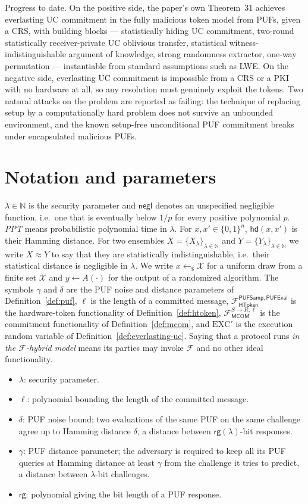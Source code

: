 \documentclass{aicr-conjecture}
\newcommand{\PUFSamp}{\mathsf{PUFSamp}}
\newcommand{\PUFEval}{\mathsf{PUFEval}}
\newcommand{\Fht}{\mathcal{F}^{\PUFSamp,\PUFEval}_{\mathsf{HToken}}}
\newcommand{\Fmcom}{\mathcal{F}^{S\to R,\ell}_{\mathsf{MCOM}}}
\newcommand{\hdist}{\mathsf{hd}}
\newcommand{\negl}{\mathsf{negl}}
\newcommand{\rge}{\mathsf{rg}}
\newcommand{\EXC}{\mathrm{EXC}'}
\newcommand{\usample}{\leftarrow_{\$}}
\begin{document}
Progress to date. On the positive side, the paper's own Theorem~31
achieves everlasting UC commitment in the fully malicious token model
from PUFs, given a CRS, with building blocks --- statistically hiding
UC commitment, two-round statistically receiver-private UC oblivious
transfer, statistical witness-indistinguishable argument of knowledge,
strong randomness extractor, one-way permutation --- instantiable from
standard assumptions such as LWE. On the negative side, everlasting UC
commitment is impossible from a CRS or a PKI with no hardware at all,
so any resolution must genuinely exploit the tokens. Two natural
attacks on the problem are reported as failing: the technique of
replacing setup by a computationally hard problem does not survive an
unbounded environment, and the known setup-free unconditional PUF
commitment breaks under encapsulated malicious PUFs.

\section{Notation and parameters}\label{sec:notation}

$\lambda\in\mathbb{N}$ is the security parameter and $\negl$ denotes an
unspecified negligible function, i.e.\ one that is eventually below
$1/p$ for every positive polynomial $p$. \emph{PPT} means probabilistic
polynomial time in $\lambda$. For $x,x'\in\{0,1\}^n$, $\hdist(x,x')$ is
their Hamming distance. For two ensembles
$X=\{X_\lambda\}_{\lambda\in\mathbb{N}}$ and
$Y=\{Y_\lambda\}_{\lambda\in\mathbb{N}}$ we write $X\approx Y$ to say
that they are statistically indistinguishable, i.e.\ their statistical
distance is negligible in $\lambda$. We write $x\usample\mathcal{X}$
for a uniform draw from a finite set $\mathcal{X}$ and
$y\leftarrow A(\cdot)$ for the output of a randomized algorithm. The
symbols $\gamma$ and $\delta$ are the PUF noise and distance parameters
of Definition~\ref{def:puf}, $\ell$ is the length of a committed
message, $\Fht$ is the hardware-token functionality of
Definition~\ref{def:htoken}, $\Fmcom$ is the commitment functionality
of Definition~\ref{def:mcom}, and $\EXC$ is the execution random
variable of Definition~\ref{def:everlasting-uc}. Saying that a protocol
runs \emph{in the $\mathcal{F}$-hybrid model} means its parties may
invoke $\mathcal{F}$ and no other ideal functionality.

\begin{itemize}
\item $\lambda$: security parameter.
\item $\ell$: polynomial bounding the length of the committed message.
\item $\delta$: PUF noise bound; two evaluations of the same PUF on the
  same challenge agree up to Hamming distance $\delta$, a distance
  between $\rge(\lambda)$-bit responses.
\item $\gamma$: PUF distance parameter; the adversary is required to
  keep all its PUF queries at Hamming distance at least $\gamma$ from
  the challenge it tries to predict, a distance between
  $\lambda$-bit challenges.
\item $\rge$: polynomial giving the bit length of a PUF response.
\end{itemize}
\end{document}
